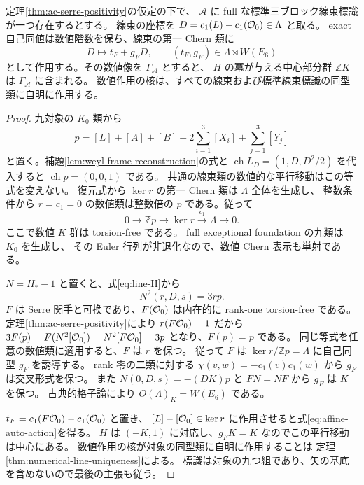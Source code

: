 \begin{proposition}\label{prop:affine-auto-action}
定理\ref{thm:ac-serre-positivity}の仮定の下で、
$\mathcal A$ に full な標準三ブロック線束標識が一つ存在するとする。
線束の座標を $D=c_1(L)-c_1(\mathcal O_0)\in\Lambda$ と取る。
exact 自己同値は数値階数を保ち、線束の第一 Chern 類に
\begin{equation}\label{eq:affine-auto-action}
 D\longmapsto t_F+g_FD,\qquad
 (t_F,g_F)\in\Lambda\rtimes W(E_6)
\end{equation}
として作用する。その数値像を $\Gamma_{\mathcal A}$ とすると、
$H$ の冪が与える中心部分群 $\mathbb ZK$ は $\Gamma_{\mathcal A}$ に含まれる。
数値作用の核は、すべての線束および標準線束標識の同型類に自明に作用する。
\end{proposition}
\begin{proof}
九対象の $K_0$ 類から
\[
 p=[L]+[A]+[B]-2\sum_{i=1}^3[X_i]+\sum_{j=1}^3[Y_j]
\]
と置く。補題\ref{lem:weyl-frame-reconstruction}の式と
$\operatorname{ch}L_D=(1,D,D^2/2)$ を代入すると
$\operatorname{ch}p=(0,0,1)$ である。
共通の線束類の数値的な平行移動はこの等式を変えない。
復元式から $\ker r$ の第一 Chern 類は $\Lambda$ 全体を生成し、
整数条件から $r=c_1=0$ の数値類は整数倍の $p$ である。従って
\[
 0\longrightarrow\mathbb Zp\longrightarrow\ker r
 \xrightarrow{c_1}\Lambda\longrightarrow0.
\]
ここで数値 $K$ 群は torsion-free である。
full exceptional foundation の九類は $K_0$ を生成し、
その Euler 行列が非退化なので、数値 Chern 表示も単射である。

$N=H_*-1$ と置くと、式\eqref{eq:line-H}から
\[
 N^2(r,D,s)=3r p.
\]
$F$ は Serre 関手と可換であり、$F(\mathcal O_0)$ は内在的に rank-one torsion-free である。
定理\ref{thm:ac-serre-positivity}により $r(F\mathcal O_0)=1$ だから
$3F(p)=F(N^2[\mathcal O_0])=N^2[F\mathcal O_0]=3p$ となり、$F(p)=p$ である。
同じ等式を任意の数値類に適用すると、$F$ は $r$ を保つ。
従って $F$ は $\ker r/\mathbb Zp=\Lambda$ に自己同型 $g_F$ を誘導する。
rank 零の二類に対する $\chi(v,w)=-c_1(v)c_1(w)$ から $g_F$ は交叉形式を保つ。
また $N(0,D,s)=-(DK)p$ と $FN=NF$ から $g_F$ は $K$ を保つ。
古典的格子論\cite[\S2.6]{DGK}により
$O(\Lambda)_K=W(E_6)$ である。

$t_F=c_1(F\mathcal O_0)-c_1(\mathcal O_0)$ と置き、
$[L]-[\mathcal O_0]\in\ker r$ に作用させると式\eqref{eq:affine-auto-action}を得る。
$H$ は $(-K,1)$ に対応し、$g_FK=K$ なのでこの平行移動は中心にある。
数値作用の核が対象の同型類に自明に作用することは
定理\ref{thm:numerical-line-uniqueness}による。
標識は対象の九つ組であり、矢の基底を含めないので最後の主張も従う。
\end{proof}

